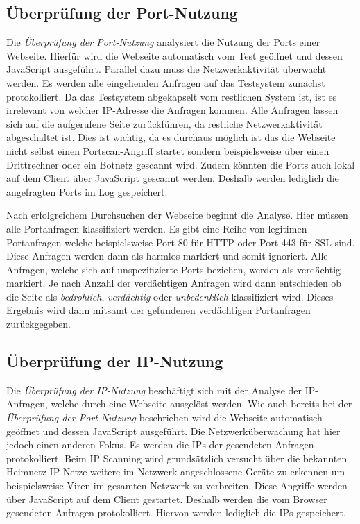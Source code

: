 \subsection{Überprüfung der Port-Nutzung}
Die \textit{Überprüfung der Port-Nutzung} analysiert die Nutzung der Ports einer Webseite. Hierfür
wird die Webseite automatisch vom Test geöffnet und dessen JavaScript ausgeführt. Parallel dazu muss die
Netzwerkaktivität überwacht werden. Es werden alle eingehenden Anfragen auf das Testsystem zunächst
protokolliert. Da das Testsystem abgekapselt vom restlichen System ist, ist es irrelevant von
welcher IP-Adresse die Anfragen kommen. Alle Anfragen lassen sich auf die aufgerufene Seite
zurückführen, da restliche Netzwerkaktivität abgeschaltet ist. Dies ist wichtig, da es durchaus
möglich ist das die Webseite nicht selbst einen Portscan-Angriff startet sondern beispielsweise
über einen Drittrechner oder ein Botnetz gescannt wird. Zudem könnten die Ports auch lokal auf dem
Client über JavaScript gescannt werden. Deshalb werden lediglich die angefragten Ports im Log
gespeichert.

Nach erfolgreichem Durchsuchen der Webseite beginnt die Analyse. Hier müssen alle Portanfragen
klassifiziert werden. Es gibt eine Reihe von legitimen Portanfragen welche beispielsweise Port 80
für \acs{HTTP} oder Port 443 für \acs{SSL} sind. Diese Anfragen werden dann als harmlos markiert und
somit ignoriert. Alle Anfragen, welche sich auf unspezifizierte Ports beziehen, werden als
verdächtig markiert. Je nach Anzahl der verdächtigen Anfragen wird dann entschieden ob die Seite
als \textit{bedrohlich}, \textit{verdächtig} oder \textit{unbedenklich} klassifiziert wird. Dieses
Ergebnis wird dann mitsamt der gefundenen verdächtigen Portanfragen zurückgegeben.

\subsection{Überprüfung der IP-Nutzung}
Die \textit{Überprüfung der IP-Nutzung} beschäftigt sich mit der Analyse der IP-Anfragen, welche
durch eine Webseite ausgelöst werden. Wie auch bereits bei der \textit{Überprüfung der Port-Nutzung}
beschrieben wird die Webseite automatisch geöffnet und dessen JavaScript ausgeführt. Die
Netzwerküberwachung hat hier jedoch einen anderen Fokus. Es werden die IPs der gesendeten Anfragen
protokolliert. Beim IP Scanning wird grundsätzlich versucht über die bekannten Heimnetz-IP-Netze
weitere im Netzwerk angeschlossene Geräte zu erkennen um beispielsweise Viren im gesamten Netzwerk
zu verbreiten. Diese Angriffe werden über JavaScript auf dem Client gestartet. Deshalb werden die
vom Browser gesendeten Anfragen protokolliert. Hiervon werden lediglich die IPs gespeichert.


